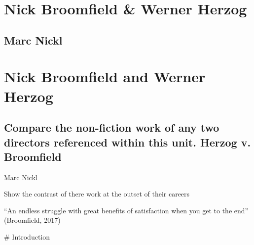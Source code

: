 \documentclass[
]{book}
\author{}
\date{}
\begin{document}
\frontmatter

\mainmatter
\hypertarget{nick-broomfield-werner-herzog}{%
\section{Nick Broomfield \& Werner Herzog}\label{nick-broomfield-werner-herzog}}

\hypertarget{marc-nickl}{%
\subsection{Marc Nickl}\label{marc-nickl}}

\hypertarget{nick-broomfield-and-werner-herzog}{%
\section{Nick Broomfield and Werner Herzog}\label{nick-broomfield-and-werner-herzog}}

\hypertarget{compare-the-non-fiction-work-of-any-two-directors-referenced-within-this-unit.-herzog-v.-broomfield}{%
\subsection{Compare the non-fiction work of any two directors referenced within this unit. Herzog v. Broomfield~}\label{compare-the-non-fiction-work-of-any-two-directors-referenced-within-this-unit.-herzog-v.-broomfield}}

Marc Nickl

Show the contrast of there work at the outset of their careers~

``An endless struggle with great benefits of satisfaction when you get to the end'' (Broomfield, 2017)

\# Introduction
\end{document}
